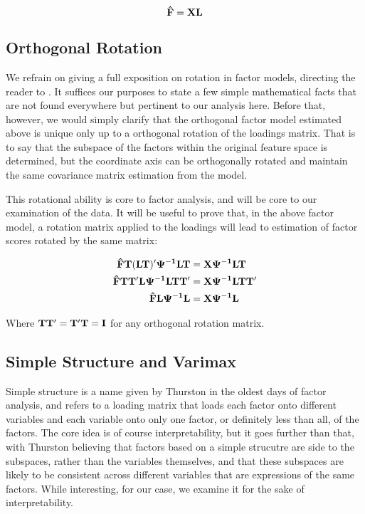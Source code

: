 \documentclass[a4paper,12pt]{article}
\begin{document}
$$
\mathbf{\hat{F}} = \mathbf{X}\mathbf{L}
$$
%
\subsection{Orthogonal Rotation}
%
We refrain on giving a full exposition on rotation in factor models, directing the reader to \cite{}. It suffices our purposes to state a few simple mathematical facts that are not found everywhere but pertinent to our analysis here. Before that, however, we would simply clarify that the orthogonal factor model estimated above is unique only up to a orthogonal rotation of the loadings matrix. That is to say that the subspace of the factors within the original feature space is determined, but the coordinate axis can be orthogonally rotated and maintain the same covariance matrix estimation from the model.

This rotational ability is core to factor analysis, and will be core to our examination of the data. It will be useful to prove that, in the above factor model, a rotation matrix applied to the loadings will lead to estimation of factor scores rotated by the same matrix:

\begin{align*}
\mathbf{\hat{F}T(LT)'\Psi^{-1}LT} &= \mathbf{X\Psi^{-1}LT} \\
\mathbf{\hat{F}TT'L\Psi^{-1}LTT'} &= \mathbf{X\Psi^{-1}LTT'} \\
\mathbf{\hat{F}L\Psi^{-1}L} &= \mathbf{X\Psi^{-1}L}
\end{align*}

Where $\mathbf{TT'} = \mathbf{T'T} = \mathbf{I}$ for any orthogonal rotation matrix.

\subsection{Simple Structure and Varimax}

Simple structure is a name given by Thurston in the oldest days of factor analysis, and refers to a loading matrix that loads each factor onto different variables and each variable onto only one factor, or definitely less than all, of the factors. The core idea is of course interpretability, but it goes further than that, with Thurston believing that factors based on a simple strucutre are side to the subspaces, rather than the variables themselves, and that these subspaces are likely to be consistent across different variables that are expressions of the same factors. While interesting, for our case, we examine it for the sake of interpretability.
\end{document}
